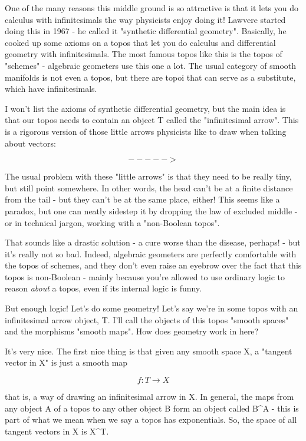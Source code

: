 One of the many reasons this middle ground is so attractive is that it
lets you do calculus with infinitesimals the way physicists enjoy
doing it!  Lawvere started doing this in 1967 - he called it
"synthetic differential geometry".  Basically, he cooked up
some axioms on a topos that let you do calculus and differential
geometry with infinitesimals.  The most famous topos like this is the
topos of "schemes" - algebraic geometers use this one a lot.
The usual category of smooth manifolds is not even a topos, but there
are topoi that can serve as a substitute, which have infinitesimals.

I won't list the axioms of synthetic differential geometry, but the
main idea is that our topos needs to contain an object T called the 
"infinitesimal arrow".  This is a rigorous version of those little 
arrows physicists like to draw when talking about vectors:  


$$

                             ----->
$$
    
The usual problem with these "little arrows" is that they need to be
really tiny, but still point somewhere.  In other words, the head
can't be at a finite distance from the tail - but they can't be at the 
same place, either!  This seems like a paradox, but one can neatly 
sidestep it by dropping the law of excluded middle - or in technical
jargon, working with a "non-Boolean topos". 

That sounds like a drastic solution - a cure worse than the disease, 
perhaps! - but it's really not so bad.  Indeed, algebraic geometers 
are perfectly comfortable with the topos of schemes, and they don't 
even raise an eyebrow over the fact that this topos is non-Boolean - 
mainly because you're allowed to use ordinary logic to reason \emph{about}
a topos, even if its internal logic is funny.

But enough logic!  Let's do some geometry!  Let's say we're in some
topos with an infinitesimal arrow object, T.  I'll call the objects of
this topos "smooth spaces" and the morphisms "smooth
maps".  How does geometry work in here?

It's very nice.  The first nice thing is that given any smooth space X, 
a "tangent vector in X" is just a smooth map 


$$

f: T \to  X
$$
    
that is, a way of drawing an infinitesimal arrow in X.  In general, the
maps from any object A of a topos to any other object B form an object
called B^{A} - this is part of what we mean when we say a topos has 
exponentials.  So, the space of all tangent vectors in X is X^{T}.  

